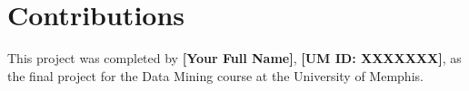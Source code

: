 \documentclass[11pt]{article}
\begin{document}
\section*{Contributions}
This project was completed by \textbf{[Your Full Name]},
\textbf{[UM ID: XXXXXXX]}, as the final project for the Data Mining
course at the University of Memphis.


\end{document}
